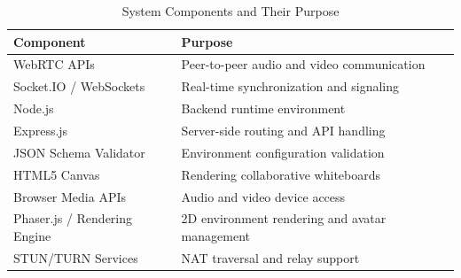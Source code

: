 \documentclass[12pt]{article}
\begin{document}
\begin{table}[h!]
\centering
\renewcommand{\arraystretch}{1.5}
\begin{tabular}{|p{6cm}|p{8cm}|}
\hline
\textbf{Component} & \textbf{Purpose} \\ 
\hline

WebRTC APIs & Peer-to-peer audio and video communication \\ 
\hline

Socket.IO / WebSockets & Real-time synchronization and signaling \\ 
\hline

Node.js & Backend runtime environment \\ 
\hline

Express.js & Server-side routing and API handling \\ 
\hline

JSON Schema Validator & Environment configuration validation \\ 
\hline

HTML5 Canvas & Rendering collaborative whiteboards \\ 
\hline

Browser Media APIs & Audio and video device access \\ 
\hline

Phaser.js / Rendering Engine & 2D environment rendering and avatar management \\ 
\hline

STUN/TURN Services & NAT traversal and relay support \\ 
\hline

\end{tabular}
\caption{System Components and Their Purpose}

\end{table}
\end{document}
